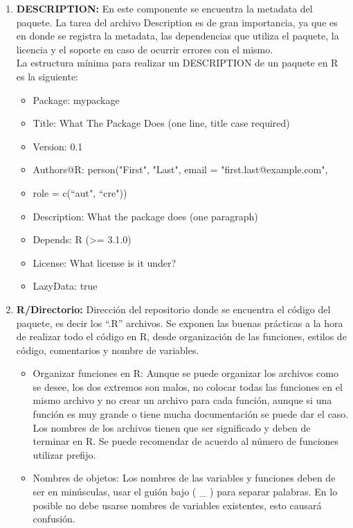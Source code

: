 \begin{enumerate}
  \item \textbf{ DESCRIPTION:} En este componente se encuentra la metadata del paquete. La tarea del archivo Description es de gran importancia, ya que es en donde se registra la metadata, las dependencias que utiliza el paquete, la licencia y el soporte en caso de ocurrir errores con el mismo.\\

La estructura m\'inima para realizar un DESCRIPTION de un paquete en R es la siguiente:

\begin{itemize}
\item Package: mypackage
\item Title: What The Package Does (one line, title case required)
\item Version: 0.1
\item Authors@R: person("First", "Last", email = "first.last@example.com",
\item role = c(``aut", ``cre"))
\item Description: What the package does (one paragraph)
\item Depends: R (>= 3.1.0)
\item License: What license is it under?
\item LazyData: true
\end{itemize}

 \item\textbf{ R/Directorio:}  Direcci\'on del repositorio donde se encuentra el c\'odigo del paquete, es decir los  ``.R'' archivos. Se exponen las buenas pr\'acticas a la hora de realizar todo el c\'odigo en R, desde organizaci\'on de las funciones, estilos de c\'odigo, comentarios y nombre de variables. 
\begin{itemize}
\item Organizar funciones en R: Aunque se puede organizar los archivos como se desee, los dos extremos son malos, no colocar todas las funciones en el mismo archivo y no crear un archivo para cada funci\'on, aunque si una funci\'on es muy grande o tiene mucha documentaci\'on se puede dar el caso. Los nombres de los archivos tienen que ser significado y deben de terminar en R. Se puede recomendar de acuerdo al n\'umero de funciones utilizar prefijo.

\item Nombres de objetos: Los nombres de las variables y funciones deben de ser en min\'usculas, usar el gui\'on bajo ( \_ ) para separar palabras. En lo posible no debe usarse nombres de variables existentes, esto causar\'a confusi\'on.


\end{itemize}
\end{enumerate}
